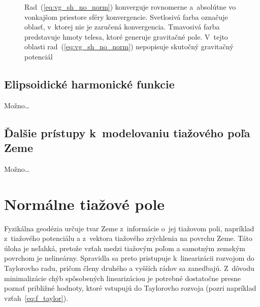 \documentclass[a4paper, 12pt]{book}
\begin{document}
\begin{figure}
\centering

\caption{Rad~(\ref{eq:vg_sh_no_norm}) konverguje rovnomerne a~absolútne vo
vonkajšom priestore sféry konvergencie.  Svetlosivá farba označuje oblasť,
v~ktorej nie je zaručená konvergencia.  Tmavosivá farba predstavuje hmoty
telesa, ktoré generuje gravitačné pole.  V~tejto oblasti
rad~(\ref{eq:vg_sh_no_norm}) nepopisuje skutočný gravitačný potenciál}
\label{fig:spherical_harmonics_convergence}
\end{figure}







\section{Elipsoidické harmonické funkcie}

Možno\dots







\section{Ďalšie prístupy k~modelovaniu tiažového poľa Zeme}

Možno\dots










\chapter{Normálne tiažové pole}
\label{sec:normal_gravity_field}

Fyzikálna geodézia určuje tvar Zeme z~informácie o~jej tiažovom poli, napríklad 
z~tiažového potenciálu a z~vektora tiažového zrýchlenia na povrchu Zeme.  Táto 
úloha je neľahká, pretože vzťah medzi tiažovým poľom a samotným zemským 
povrchom je nelineárny.  Spravidla sa preto pristupuje k~linearizácii rozvojom 
do Taylorovho radu, pričom členy druhého a vyšších rádov sa zanedbajú.  
Z~dôvodu minimalizácie chýb spôsobených linearizáciou je potrebné dostatočne 
presne poznať približné hodnoty, ktoré vstupujú do Taylorovho rozvoja (pozri 
napríklad vzťah~\ref{eq:f_taylor}).
\end{document}
